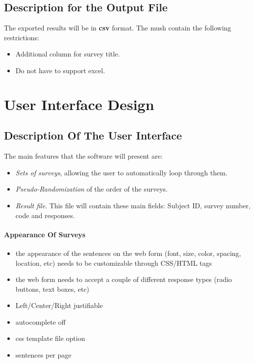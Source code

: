 \documentclass[a4paper,12pt,oneside]{report}
\begin{document}
\section{Description for the Output File}
The exported results will be in {\bf csv} format. The mush contain the following restrictions:
\begin {itemize}
\item Additional column for survey title.
 \item Do not have to support excel.
\end{itemize}


\chapter{ User Interface Design}

\section{  Description Of The User Interface}

The main features that the software will present are:
\begin{itemize}
\item {\it Sets of surveys}, allowing the user to automatically loop through them.
\item {\it Pseudo-Randomization} of the order of the surveys.
\item {\it Result file}. This file will contain these main fields: Subject ID, survey number, code and responses.
\end{itemize}

\subsubsection { Appearance Of Surveys}
\begin{itemize} 
	\item  the appearance of the sentences on the web form (font, size, color, spacing, location, etc) needs to be customizable through CSS/HTML tags
	\item the web form needs to accept a couple of different response types (radio buttons, text boxes, etc)
	\item Left/Center/Right justifiable
	\item autocomplete off
	\item css template file option
	\item sentences per page
\end{itemize}
\end{document}
